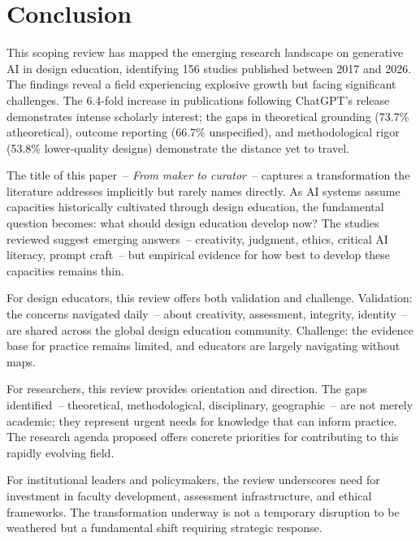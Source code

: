 \documentclass[ed]{acnsart}
\newcommand{\nstudies}{156}
\begin{document}

\section{Conclusion}
\label{sec:conclusion}

This scoping review has mapped the emerging research landscape on generative AI in design education, identifying \nstudies{} studies published between 2017 and 2026. The findings reveal a field experiencing explosive growth but facing significant challenges. The 6.4-fold increase in publications following ChatGPT's release demonstrates intense scholarly interest; the gaps in theoretical grounding (73.7\% atheoretical), outcome reporting (66.7\% unspecified), and methodological rigor (53.8\% lower-quality designs) demonstrate the distance yet to travel.

The title of this paper~-- \textit{From maker to curator}~-- captures a transformation the literature addresses implicitly but rarely names directly. As AI systems assume capacities historically cultivated through design education, the fundamental question becomes: what should design education develop now? The studies reviewed suggest emerging answers~-- creativity, judgment, ethics, critical AI literacy, prompt craft~-- but empirical evidence for how best to develop these capacities remains thin.

For design educators, this review offers both validation and challenge. Validation: the concerns navigated daily~-- about creativity, assessment, integrity, identity~-- are shared across the global design education community. Challenge: the evidence base for practice remains limited, and educators are largely navigating without maps.

For researchers, this review provides orientation and direction. The gaps identified~-- theoretical, methodological, disciplinary, geographic~-- are not merely academic; they represent urgent needs for knowledge that can inform practice. The research agenda proposed offers concrete priorities for contributing to this rapidly evolving field.

For institutional leaders and policymakers, the review underscores need for investment in faculty development, assessment infrastructure, and ethical frameworks. The transformation underway is not a temporary disruption to be weathered but a fundamental shift requiring strategic response.
\end{document}
